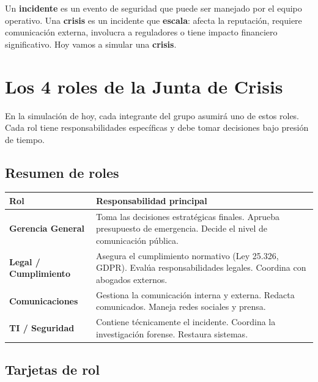 \documentclass[12pt,a4paper]{article}
\renewcommand{\arraystretch}{1.25}
\begin{document}
\begin{cajaNota}[title={La diferencia entre un incidente y una crisis}]
Un \textbf{incidente} es un evento de seguridad que puede ser manejado por el equipo operativo. Una \textbf{crisis} es un incidente que \textbf{escala}: afecta la reputaci\'on, requiere comunicaci\'on externa, involucra a reguladores o tiene impacto financiero significativo. Hoy vamos a simular una \textbf{crisis}.
\end{cajaNota}

\newpage
\section{Los 4 roles de la Junta de Crisis}

En la simulaci\'on de hoy, cada integrante del grupo asumir\'a uno de estos roles. Cada rol tiene responsabilidades espec\'ificas y debe tomar decisiones bajo presi\'on de tiempo.

\subsection{Resumen de roles}

\renewcommand{\arraystretch}{1.5}
\begin{tabularx}{\textwidth}{|>{\bfseries}p{3cm}|X|}
\hline
\rowcolor{grisClaro}
\textbf{Rol} & \textbf{Responsabilidad principal} \\
\hline
\textbf{Gerencia General} & Toma las decisiones estrat\'egicas finales. Aprueba presupuesto de emergencia. Decide el nivel de comunicaci\'on p\'ublica. \\
\hline
\textbf{Legal / Cumplimiento} & Asegura el cumplimiento normativo (Ley 25.326, GDPR). Eval\'ua responsabilidades legales. Coordina con abogados externos. \\
\hline
\textbf{Comunicaciones} & Gestiona la comunicaci\'on interna y externa. Redacta comunicados. Maneja redes sociales y prensa. \\
\hline
\textbf{TI / Seguridad} & Contiene t\'ecnicamente el incidente. Coordina la investigaci\'on forense. Restaura sistemas. \\
\hline
\end{tabularx}

\newpage
\subsection{Tarjetas de rol}
\end{document}
